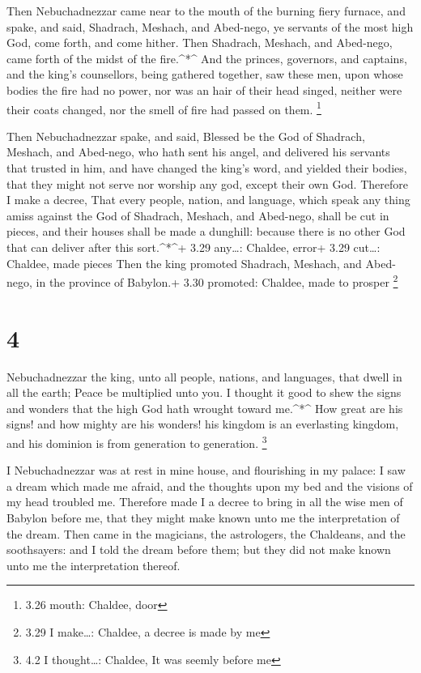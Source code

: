  Then Nebuchadnezzar came near to the mouth of the burning
fiery furnace, and spake, and said, Shadrach, Meshach, and Abed-nego, ye
servants of the most high God, come forth, and come hither. Then
Shadrach, Meshach, and Abed-nego, came forth of the midst of the
fire.\^{}*\^{}  And the princes, governors, and captains,
and the king's counsellors, being gathered together, saw these men, upon
whose bodies the fire had no power, nor was an hair of their head
singed, neither were their coats changed, nor the smell of fire had
passed on them. \footnote{3.26 mouth: Chaldee, door}

 Then Nebuchadnezzar spake, and said, Blessed be the God of
Shadrach, Meshach, and Abed-nego, who hath sent his angel, and delivered
his servants that trusted in him, and have changed the king's word, and
yielded their bodies, that they might not serve nor worship any god,
except their own God.  Therefore I make a decree, That
every people, nation, and language, which speak any thing amiss against
the God of Shadrach, Meshach, and Abed-nego, shall be cut in pieces, and
their houses shall be made a dunghill: because there is no other God
that can deliver after this sort.\^{}*\^{}+ 3.29 any\ldots: Chaldee,
error+ 3.29 cut\ldots: Chaldee, made pieces  Then the king
promoted Shadrach, Meshach, and Abed-nego, in the province of Babylon.+
3.30 promoted: Chaldee, made to prosper \footnote{3.29 I make\ldots:
  Chaldee, a decree is made by me}

\hypertarget{section-3}{%
\section{4}\label{section-3}}

 Nebuchadnezzar the king, unto all people, nations, and
languages, that dwell in all the earth; Peace be multiplied unto you.
 I thought it good to shew the signs and wonders that the
high God hath wrought toward me.\^{}*\^{}  How great are his
signs! and how mighty are his wonders! his kingdom is an everlasting
kingdom, and his dominion is from generation to generation. \footnote{4.2
  I thought\ldots: Chaldee, It was seemly before me}

 I Nebuchadnezzar was at rest in mine house, and flourishing
in my palace:  I saw a dream which made me afraid, and the
thoughts upon my bed and the visions of my head troubled me.
 Therefore made I a decree to bring in all the wise men of
Babylon before me, that they might make known unto me the interpretation
of the dream.  Then came in the magicians, the astrologers,
the Chaldeans, and the soothsayers: and I told the dream before them;
but they did not make known unto me the interpretation thereof.

